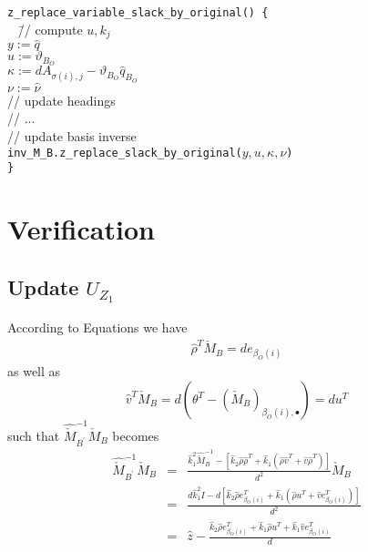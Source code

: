 \documentclass[a4paper]{article}
\begin{document}
\begin{tabbing}
\texttt{z\_replace\_variable\_slack\_by\_original() \{} \\
\texttt{  } \= // compute $u, k_{j}$ \\
\> \texttt{$y:=\hat{q}$} \\
\> \texttt{$u:=\vartheta_{B_{O}}$} \\
\> \texttt{$\kappa:=dA_{\sigma(i), j}-\vartheta_{B_{O}}\hat{q}_{B_{O}}$} \\
\> \texttt{$\nu:=\hat{\nu}$} \\
\> // update headings \\
\> // ... \\
\> // update basis inverse \\
\> \texttt{inv\_M\_B.z\_replace\_slack\_by\_original($y, u, \kappa, \nu$)}
\\
\texttt{\}}
\end{tabbing}



\section{Verification}
\subsection{Update $U_{Z_{1}}$}
According to Equations  we have
\begin{eqnarray}
\hat{\rho}^{T}\check{M}_{B}=de_{\beta_{O}(i)}
\end{eqnarray}
as well as 
\begin{equation}
\hat{v}^{T}\check{M}_{B}=
d\left(\theta^{T} 
   -\left(\check{M}_{B}\right)_{\beta_{O}(i), \bullet}
 \right)
=
du^{T}
\end{equation}
such that $\hat{\check{M}}_{B^{\prime}}^{-1}\check{M}_{B}$ becomes
\begin{eqnarray}
\hat{\check{M}}_{B^{\prime}}^{-1}
\check{M}_{B}
&=&
\frac{
\hat{k}_{1}^{2}\hat{\check{M}}_{B}^{-1}
-\left[
  \hat{k}_{2}\hat{\rho}\hat{\rho}^{T}
  +\hat{k}_{1}\left(\hat{\rho}\hat{v}^{T} +\hat{v}\hat{\rho}^{T}\right)
 \right]
}{d^{2}}
\check{M}_{B}
\nonumber \\
&=&
\frac{
  d\hat{k}_{1}^{2}I
  -d
  \left[
    \hat{k}_{2}\hat{\rho}e_{\beta_{O}(i)}^{T}
    +\hat{k}_{1}
    \left(
      \hat{\rho}u^{T}
      +\hat{v}e_{\beta_{O}(i)}^{T}
    \right)
  \right]
}{d^{2}}
\nonumber \\
&=&
\hat{z}
-\frac{
  \hat{k}_{2}\hat{\rho}e_{\beta_{O}(i)}^{T}
  +\hat{k}_{1}\hat{\rho}u^{T}
  +\hat{k}_{1}\hat{v}e_{\beta_{O}(i)}^{T}
}{d}
\end{eqnarray}
\end{document}
